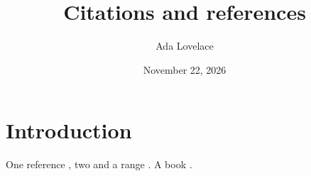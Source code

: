 \documentclass[reprint,aps,pra,superscriptaddress,10pt,nofootinbib,nobalancelastpage]{revtex4-2}
\begin{document}
\title{Citations and references}
\author{Ada Lovelace}
\date{November 22, 2026}
\maketitle
\section{Introduction}
One reference \cite{Gisin:07}, two \cite{Gisin:07, Raussendorf:03} and a range \cite{Gisin:07, Raussendorf:03, Grover:97}. A book \cite{Nielsen:10}.

\end{document}
